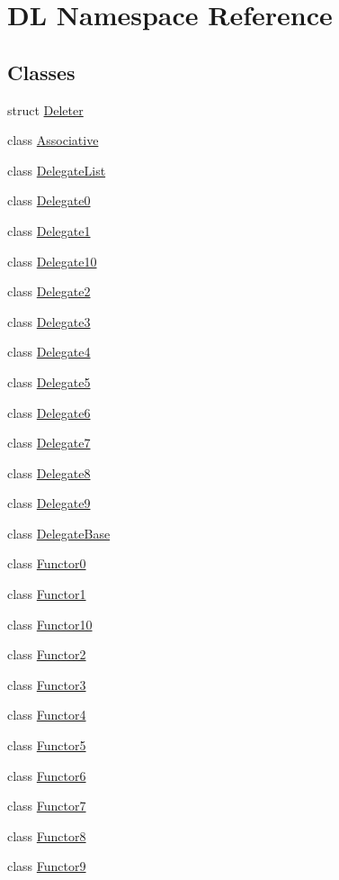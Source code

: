 \hypertarget{namespaceDL}{
\section{DL Namespace Reference}
\label{namespaceDL}
}


\subsection*{Classes}
\begin{CompactItemize}
\item 
struct \hyperlink{structDL_1_1Deleter}{Deleter}
\item 
class \hyperlink{classDL_1_1Associative}{Associative}
\item 
class \hyperlink{classDL_1_1DelegateList}{Delegate\-List}
\item 
class \hyperlink{classDL_1_1Delegate0}{Delegate0}
\item 
class \hyperlink{classDL_1_1Delegate1}{Delegate1}
\item 
class \hyperlink{classDL_1_1Delegate10}{Delegate10}
\item 
class \hyperlink{classDL_1_1Delegate2}{Delegate2}
\item 
class \hyperlink{classDL_1_1Delegate3}{Delegate3}
\item 
class \hyperlink{classDL_1_1Delegate4}{Delegate4}
\item 
class \hyperlink{classDL_1_1Delegate5}{Delegate5}
\item 
class \hyperlink{classDL_1_1Delegate6}{Delegate6}
\item 
class \hyperlink{classDL_1_1Delegate7}{Delegate7}
\item 
class \hyperlink{classDL_1_1Delegate8}{Delegate8}
\item 
class \hyperlink{classDL_1_1Delegate9}{Delegate9}
\item 
class \hyperlink{classDL_1_1DelegateBase}{Delegate\-Base}
\item 
class \hyperlink{classDL_1_1Functor0}{Functor0}
\item 
class \hyperlink{classDL_1_1Functor1}{Functor1}
\item 
class \hyperlink{classDL_1_1Functor10}{Functor10}
\item 
class \hyperlink{classDL_1_1Functor2}{Functor2}
\item 
class \hyperlink{classDL_1_1Functor3}{Functor3}
\item 
class \hyperlink{classDL_1_1Functor4}{Functor4}
\item 
class \hyperlink{classDL_1_1Functor5}{Functor5}
\item 
class \hyperlink{classDL_1_1Functor6}{Functor6}
\item 
class \hyperlink{classDL_1_1Functor7}{Functor7}
\item 
class \hyperlink{classDL_1_1Functor8}{Functor8}
\item 
class \hyperlink{classDL_1_1Functor9}{Functor9}
\end{CompactItemize}
